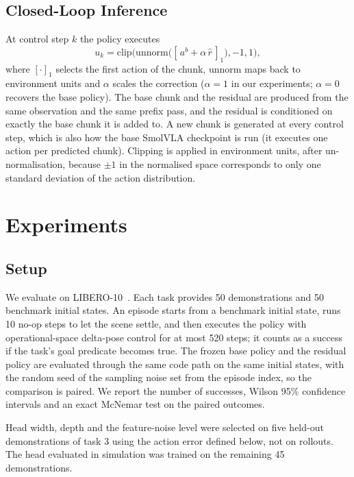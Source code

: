 \documentclass[conference]{IEEEtran}
\begin{document}
\subsection{Closed-Loop Inference}
At control step $k$ the policy executes
\begin{equation}
    u_k=\mathrm{clip}\bigl(\mathrm{unnorm}\bigl([\,a^{b}+\alpha\,\hat r\,]_{1}\bigr),-1,1\bigr),
\end{equation}
where $[\cdot]_1$ selects the first action of the chunk, $\mathrm{unnorm}$ maps back to environment units and $\alpha$ scales the correction ($\alpha=1$ in our experiments; $\alpha=0$ recovers the base policy). The base chunk and the residual are produced from the same observation and the same prefix pass, and the residual is conditioned on exactly the base chunk it is added to. A new chunk is generated at every control step, which is also how the base SmolVLA checkpoint is run (it executes one action per predicted chunk). Clipping is applied in environment units, after un-normalisation, because $\pm1$ in the normalised space corresponds to only one standard deviation of the action distribution.

\section{Experiments}

\subsection{Setup}
We evaluate on LIBERO-10~\cite{libero}. Each task provides 50 demonstrations and 50 benchmark initial states. An episode starts from a benchmark initial state, runs 10 no-op steps to let the scene settle, and then executes the policy with operational-space delta-pose control for at most 520 steps; it counts as a success if the task's goal predicate becomes true. The frozen base policy and the residual policy are evaluated through the same code path on the same initial states, with the random seed of the sampling noise set from the episode index, so the comparison is paired. We report the number of successes, Wilson 95\% confidence intervals and an exact McNemar test on the paired outcomes.

Head width, depth and the feature-noise level were selected on five held-out demonstrations of task 3 using the action error defined below, not on rollouts. The head evaluated in simulation was trained on the remaining 45 demonstrations.
\end{document}
